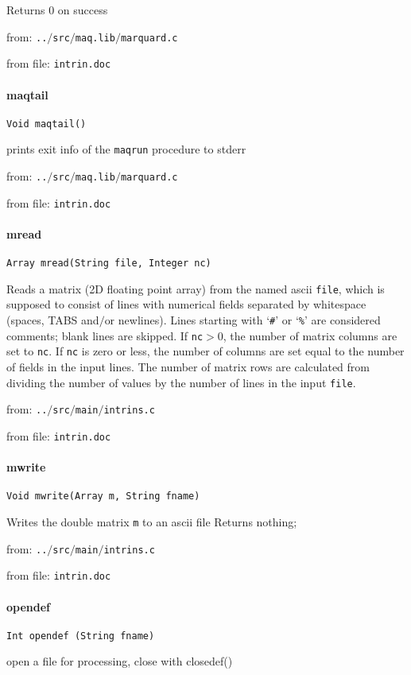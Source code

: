 Returns 0 on success


from: {\tt ..$/$src$/$maq.lib$/$marquard.c}

from file: {\tt intrin.doc}


\paragraph{maqtail}
\begin{verbatim}
Void maqtail()
\end{verbatim}
prints exit info of the {\tt maqrun} procedure to
stderr


from: {\tt ..$/$src$/$maq.lib$/$marquard.c}

from file: {\tt intrin.doc}


\paragraph{mread}
\begin{verbatim}
Array mread(String file, Integer nc)
\end{verbatim}
Reads a matrix (2D floating point array) from the named
ascii {\tt file}, which is supposed to consist of lines with
numerical fields separated by whitespace (spaces, TABS
and$/$or newlines). Lines starting with `{\tt \#}' or `{\tt \%}' are
considered comments; blank lines are skipped. If {\tt nc}$>$0,
the number of matrix columns are set to {\tt nc}. If {\tt nc} is
zero or less, the number of columns are set equal to the
number of fields in the input lines. The number of matrix
rows are calculated from dividing the number of values by
the number of lines in the input {\tt file}.


from: {\tt ..$/$src$/$main$/$intrins.c}

from file: {\tt intrin.doc}


\paragraph{mwrite}
\begin{verbatim}
Void mwrite(Array m, String fname)
\end{verbatim}
Writes the double matrix {\tt m} to an ascii file
Returns nothing;


from: {\tt ..$/$src$/$main$/$intrins.c}

from file: {\tt intrin.doc}


\paragraph{opendef}
\begin{verbatim}
Int opendef (String fname)
\end{verbatim}
open a file for processing, close with closedef()


